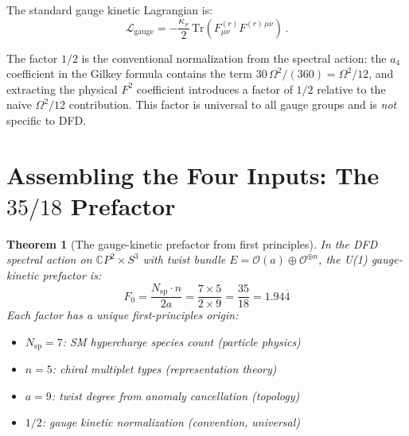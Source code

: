 \documentclass[12pt,a4paper]{article}
\newtheorem{theorem}{Theorem}[section]
\theoremstyle{definition}
\begin{document}
The standard gauge kinetic Lagrangian is:
\begin{equation}
\mathcal{L}_{\mathrm{gauge}} = -\frac{\kappa_r}{2}\,
\mathrm{Tr}(F_{\mu\nu}^{(r)} F^{(r)\,\mu\nu})\,.
\end{equation}

The factor $1/2$ is the conventional normalization from the spectral
action: the $a_4$ coefficient in the Gilkey formula contains the term
$30\,\Omega^2/(360) = \Omega^2/12$, and extracting the physical $F^2$
coefficient introduces a factor of $1/2$ relative to the naive
$\Omega^2/12$ contribution.  This factor is universal to all gauge groups
and is \emph{not} specific to DFD.

\section{Assembling the Four Inputs: The $35/18$ Prefactor}
\label{sec:assembly}

\begin{theorem}[The gauge-kinetic prefactor from first principles]
\label{thm:35-18}
In the DFD spectral action on $\mathbb{C}P^2 \times S^3$ with twist
bundle $E = \mathcal{O}(a) \oplus \mathcal{O}^{\oplus n}$, the U(1)
gauge-kinetic prefactor is:
\begin{equation}\label{eq:prefactor}
\boxed{
F_0 = \frac{N_{\mathrm{sp}} \cdot n}{2a}
= \frac{7 \times 5}{2 \times 9} = \frac{35}{18} = 1.94\overline{4}
}
\end{equation}
Each factor has a unique first-principles origin:
\begin{itemize}
\item $N_{\mathrm{sp}} = 7$: SM hypercharge species count (particle physics)
\item $n = 5$: chiral multiplet types (representation theory)
\item $a = 9$: twist degree from anomaly cancellation (topology)
\item $1/2$: gauge kinetic normalization (convention, universal)
\end{itemize}
\end{theorem}
\end{document}
